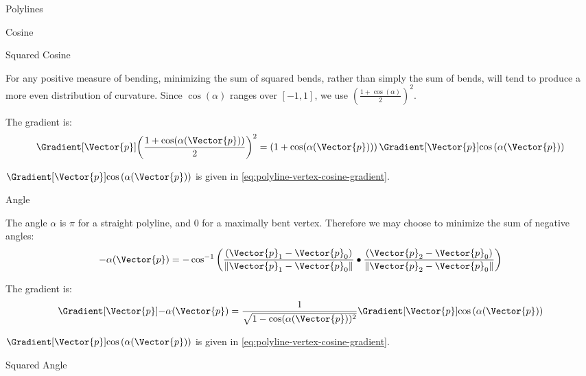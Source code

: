 \begin{plSection}{Polylines}
\begin{plSection}{Cosine}
\end{plSection}%
\begin{plSection}{Squared Cosine}
\label{sec:polyline-vertex-squared-cosine}

For any positive measure of bending,
minimizing the sum of squared bends,
rather than simply the sum of bends,
will tend to produce a more even distribution of curvature.
Since $\cos(\alpha)$ ranges over $[-1,1]$,
we use $\left( \frac{1 + \cos(\alpha)}{2} \right)^2$.

The gradient is:
\begin{equation}
\Gradient[\Vector{p}]{\left( {{1 + \cos(\alpha(\Vector{p}))} \over 2} \right)^2}
=
\left( 1 + \cos(\alpha(\Vector{p})) \right)
\Gradient[\Vector{p}]{\cos\left(\alpha(\Vector{p})\right)}
\end{equation}

$\Gradient[\Vector{p}]{\cos\left(\alpha(\Vector{p})\right)}$ is given
in \cref{eq:polyline-vertex-cosine-gradient}.

\end{plSection}%
\begin{plSection}{Angle}
\label{sec:polyline-vertex-angle}


The angle $\alpha$ is $\pi$ for a straight polyline,
and $0$ for a maximally bent vertex.
Therefore we may choose to minimize the sum of negative angles:
\begin{equation}
-\alpha(\Vector{p}) =
-\cos^{-1} \left(
{{(\Vector{p}_1 - \Vector{p}_0)} \over {\| \Vector{p}_1 - \Vector{p}_0 \|} }
\bullet
{{(\Vector{p}_2 - \Vector{p}_0)} \over {\| \Vector{p}_2 - \Vector{p}_0 \|} }
\right)
\end{equation}

The gradient is:
\begin{equation}
\Gradient[\Vector{p}]{-\alpha(\Vector{p})}
=
{{1} \over {\sqrt{ 1 - \cos(\alpha(\Vector{p}))^2}}}
\Gradient[\Vector{p}]{\cos\left(\alpha(\Vector{p})\right)}
\end{equation}

$\Gradient[\Vector{p}]{\cos\left(\alpha(\Vector{p})\right)}$ is given
in \cref{eq:polyline-vertex-cosine-gradient}.

\end{plSection}%
\begin{plSection}{Squared Angle}
\label{sec:polyline-vertex-squared-angle}


\end{plSection}
\end{plSection}
